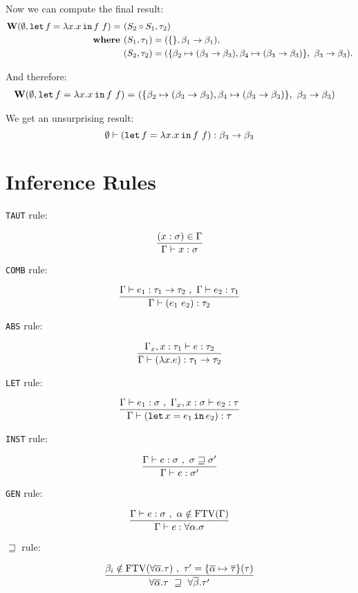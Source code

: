 \documentclass[a4paper,oneside]{memoir}
\begin{document}
Now we can compute the final result:
\begin{align*}
\operatorname{\textbf{W}}(\emptyset, \texttt{let} \, f = \lambda x . x \, \texttt{in} \, f~f) = ~ & (S_2 \circ S_1, \tau_2) \\
\operatorname{\textbf{where~}} & (S_1, \tau_1) = (\{\}, \beta_1 \rightarrow \beta_1 ), \\
       & (S_2, \tau_2) = (\{ \beta_2 \mapsto (\beta_3 \rightarrow \beta_3), \beta_4 \mapsto (\beta_3 \rightarrow \beta_3) \}, ~ \beta_3 \rightarrow \beta_3 ).
\end{align*}

And therefore:
\begin{align*}
\operatorname{\textbf{W}}(\emptyset, \texttt{let} \, f = \lambda x . x \, \texttt{in} \, f~f) = ~ & (\{ \beta_2 \mapsto (\beta_3 \rightarrow \beta_3), \beta_4 \mapsto (\beta_3 \rightarrow \beta_3) \},~ \beta_3 \rightarrow \beta_3)
\end{align*}

We get an unsurprising result:
$$\emptyset \vdash (\texttt{let} \, f = \lambda x . x \, \texttt{in} \, f~f) : \beta_3 \rightarrow \beta_3$$


\section{Inference Rules}

\texttt{TAUT} rule:

$$\dfrac{(x : \sigma) \in \Gamma}{ \Gamma \vdash x : \sigma}$$

\texttt{COMB} rule:

$$\dfrac{\Gamma \vdash e_1 : \tau_1 \rightarrow \tau_2\ ,\ \Gamma \vdash e_2 : \tau_1}{\Gamma \vdash (e_1~e_2) : \tau_2}$$

\texttt{ABS} rule:

$$\dfrac{\Gamma_x,x:\tau_1 \vdash e : \tau_2}{\Gamma \vdash (\lambda x . e) :  \tau_1 \rightarrow \tau_2}$$

\texttt{LET} rule:

$$\dfrac{\Gamma \vdash e_1 : \sigma\ ,\ \Gamma_x,x:\sigma \vdash e_2 : \tau}{\Gamma \vdash (\texttt{let} \, x = e_1 \, \texttt{in} \, e_2) :  \tau}$$

\texttt{INST} rule:

$$\dfrac{\Gamma \vdash e : \sigma\ ,\ \sigma \sqsupseteq \sigma^\prime}{\Gamma \vdash e : \sigma^\prime}$$

\texttt{GEN} rule:

$$\dfrac{\Gamma \vdash e : \sigma\ ,\ \alpha \notin \operatorname{FTV}(\Gamma)}{\Gamma \vdash e : \forall \alpha . \sigma}$$

$\sqsupseteq$ rule:

$$\dfrac{\beta_i \notin \operatorname{FTV}(\forall \overline{\alpha}.\tau)\ ,\ \tau^\prime = \{\overline{\alpha} \mapsto \overline{\tau}\}(\tau)}{\forall \overline{\alpha}.\tau  ~ \sqsupseteq ~   \forall \overline{\beta}.\tau^\prime}$$
\end{document}
